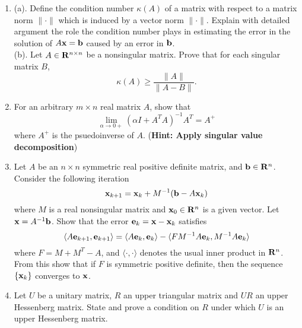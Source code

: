 \begin{large}
\begin{enumerate}
\item 
(a). Define the condition number $\kappa (A)$ of a matrix with respect to
a matrix norm $\| \cdot \|$ which is induced by a vector norm $\| \cdot \|$.
Explain with detailed argument the role the condition number plays
in estimating the error in the solution of $A {\bf x} = {\bf b}$ caused by
an error in ${\bf b}$. \\
(b). Let $A \in {\bf R}^{n \times n}$ be a nonsingular matrix. Prove that
for each singular matrix $B$, 
$$\kappa (A) \geq \frac{\| A \|}{\| A - B \|}.$$

 \item  For an arbitrary $m \times n$ real matrix $A$, show that
$$ \lim_{\alpha \rightarrow 0+}(\alpha I + A^TA)^{-1}A^T = A^+$$
where $A^+$ is the psuedoinverse of $A$. ({\bf Hint: Apply singular 
value decomposition})

\item  Let $A$ be an $n \times n$ symmetric real positive definite
matrix, and ${\bf b} \in {\bf R}^n$. Consider the following iteration
$$ {\bf x}_{k+1} = {\bf x}_k + M^{-1}({\bf b}-A{\bf x}_k)$$
where $M$ is a real nonsingular matrix and ${\bf x}_0 \in {\bf R}^n$ is a
given vector. Let ${\bf x} = A^{-1}{\bf b}$. Show that the error 
${\bf e}_k={\bf x}-{\bf x}_k$ satisfies
$$\langle A{\bf e}_{k+1},{\bf e}_{k+1} \rangle 
= \langle A{\bf e}_k,{\bf e}_k \rangle -
\langle FM^{-1}A{\bf e}_k,M^{-1}A{\bf e}_k \rangle $$ 
where $F=M + M^T - A$, and 
$\langle \cdot,\cdot \rangle $ denotes the usual inner 
product in ${\bf R}^n$. From this show 
that if $F$ is symmetric positive definite, then the sequence $\{ {\bf x}_k \}$
converges to ${\bf x}$.

\item 
Let $U$ be a unitary matrix, $R$ an upper triangular matrix and $UR$ an upper
Hessenberg matrix. State and prove a condition on $R$ under which $U$ is an
upper Hessenberg matrix. 

\end{enumerate}




\end{large}



%
%

